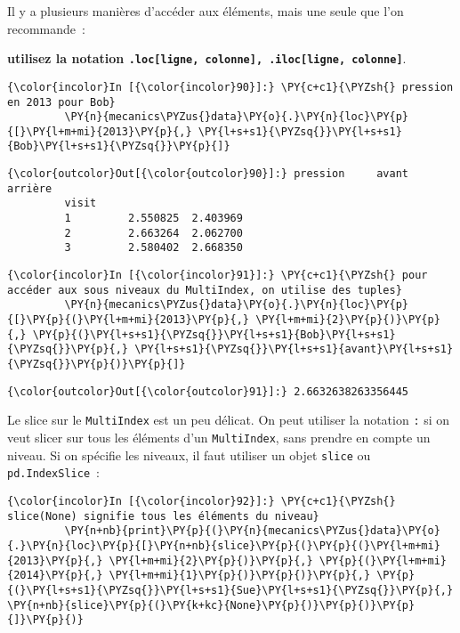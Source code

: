     Il y a plusieurs manières d'accéder aux éléments, mais une seule que
l'on recommande~:

\textbf{utilisez la notation
\texttt{.loc{[}ligne,\ colonne{]},\ .iloc{[}ligne,\ colonne{]}}}.

    \begin{Verbatim}[commandchars=\\\{\}]
{\color{incolor}In [{\color{incolor}90}]:} \PY{c+c1}{\PYZsh{} pression en 2013 pour Bob}
         \PY{n}{mecanics\PYZus{}data}\PY{o}{.}\PY{n}{loc}\PY{p}{[}\PY{l+m+mi}{2013}\PY{p}{,} \PY{l+s+s1}{\PYZsq{}}\PY{l+s+s1}{Bob}\PY{l+s+s1}{\PYZsq{}}\PY{p}{]}
\end{Verbatim}


\begin{Verbatim}[commandchars=\\\{\}]
{\color{outcolor}Out[{\color{outcolor}90}]:} pression     avant   arrière
         visit                       
         1         2.550825  2.403969
         2         2.663264  2.062700
         3         2.580402  2.668350
\end{Verbatim}
            
    \begin{Verbatim}[commandchars=\\\{\}]
{\color{incolor}In [{\color{incolor}91}]:} \PY{c+c1}{\PYZsh{} pour accéder aux sous niveaux du MultiIndex, on utilise des tuples}
         \PY{n}{mecanics\PYZus{}data}\PY{o}{.}\PY{n}{loc}\PY{p}{[}\PY{p}{(}\PY{l+m+mi}{2013}\PY{p}{,} \PY{l+m+mi}{2}\PY{p}{)}\PY{p}{,} \PY{p}{(}\PY{l+s+s1}{\PYZsq{}}\PY{l+s+s1}{Bob}\PY{l+s+s1}{\PYZsq{}}\PY{p}{,} \PY{l+s+s1}{\PYZsq{}}\PY{l+s+s1}{avant}\PY{l+s+s1}{\PYZsq{}}\PY{p}{)}\PY{p}{]}
\end{Verbatim}


\begin{Verbatim}[commandchars=\\\{\}]
{\color{outcolor}Out[{\color{outcolor}91}]:} 2.6632638263356445
\end{Verbatim}
            
    Le slice sur le \texttt{MultiIndex} est un peu délicat. On peut utiliser
la notation \texttt{:} si on veut slicer sur tous les éléments d'un
\texttt{MultiIndex}, sans prendre en compte un niveau. Si on spécifie
les niveaux, il faut utiliser un objet \texttt{slice} ou
\texttt{pd.IndexSlice}~:

    \begin{Verbatim}[commandchars=\\\{\}]
{\color{incolor}In [{\color{incolor}92}]:} \PY{c+c1}{\PYZsh{} slice(None) signifie tous les éléments du niveau}
         \PY{n+nb}{print}\PY{p}{(}\PY{n}{mecanics\PYZus{}data}\PY{o}{.}\PY{n}{loc}\PY{p}{[}\PY{n+nb}{slice}\PY{p}{(}\PY{p}{(}\PY{l+m+mi}{2013}\PY{p}{,} \PY{l+m+mi}{2}\PY{p}{)}\PY{p}{,} \PY{p}{(}\PY{l+m+mi}{2014}\PY{p}{,} \PY{l+m+mi}{1}\PY{p}{)}\PY{p}{)}\PY{p}{,} \PY{p}{(}\PY{l+s+s1}{\PYZsq{}}\PY{l+s+s1}{Sue}\PY{l+s+s1}{\PYZsq{}}\PY{p}{,} \PY{n+nb}{slice}\PY{p}{(}\PY{k+kc}{None}\PY{p}{)}\PY{p}{)}\PY{p}{]}\PY{p}{)}
\end{Verbatim}



